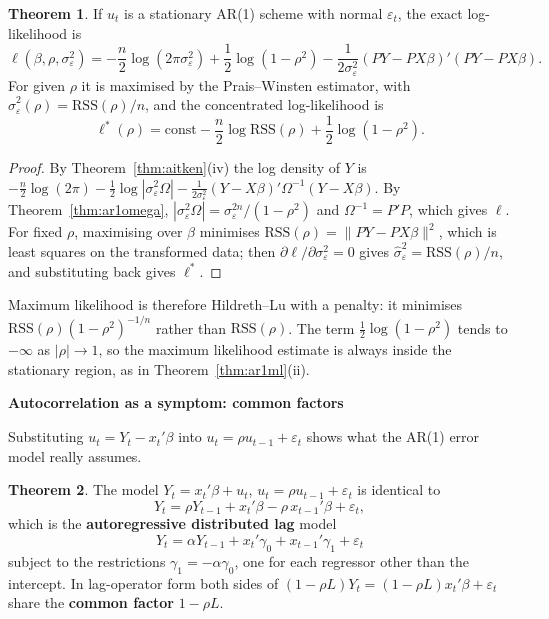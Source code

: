 \documentclass[11pt,a4paper]{article}
\numberwithin{equation}{section}
\theoremstyle{definition}
\newtheorem{thm}{Theorem}[subsection]
\newcommand{\subhead}[1]{%
  \par\medskip\noindent\textbf{#1}\par\nobreak\smallskip}
\begin{document}
\begin{thm}
\label{thm:acml}
If $u_t$ is a stationary AR(1) scheme with normal $\varepsilon_t$, the exact log-likelihood is
\[
\ell(\beta, \rho, \sigma_\varepsilon^2) = -\frac n2\log(2\pi\sigma_\varepsilon^2) + \frac12\log(1 - \rho^2) - \frac{1}{2\sigma_\varepsilon^2}(PY - PX\beta)'(PY - PX\beta) .
\]
For given $\rho$ it is maximised by the Prais--Winsten estimator, with $\hat\sigma_\varepsilon^2(\rho) = \text{RSS}(\rho)/n$, and the concentrated log-likelihood is
\[
\ell^*(\rho) = \text{const} - \frac n2\log\text{RSS}(\rho) + \frac12\log(1 - \rho^2) .
\]
\end{thm}

\begin{proof}
By Theorem~\ref{thm:aitken}(iv) the log density of $Y$ is $-\frac n2\log(2\pi) - \frac12\log|\sigma_\varepsilon^2\Omega| - \frac{1}{2\sigma_\varepsilon^2}(Y - X\beta)'\Omega^{-1}(Y - X\beta)$. By
Theorem~\ref{thm:ar1omega}, $|\sigma_\varepsilon^2\Omega| = \sigma_\varepsilon^{2n}/(1 - \rho^2)$ and $\Omega^{-1} = P'P$, which gives $\ell$. For fixed $\rho$, maximising over $\beta$ minimises
$\text{RSS}(\rho) = \|PY - PX\beta\|^2$, which is least squares on the transformed data; then $\partial\ell/\partial\sigma_\varepsilon^2 = 0$ gives $\hat\sigma_\varepsilon^2 = \text{RSS}(\rho)/n$, and
substituting back gives $\ell^*$.
\end{proof}

Maximum likelihood is therefore Hildreth--Lu with a penalty: it minimises $\text{RSS}(\rho)(1 - \rho^2)^{-1/n}$ rather than $\text{RSS}(\rho)$. The term $\frac12\log(1 - \rho^2)$
tends to $-\infty$ as $|\rho| \to 1$, so the maximum likelihood estimate is always inside the stationary region, as in Theorem~\ref{thm:ar1ml}(ii).

\subhead{Autocorrelation as a symptom: common factors}
Substituting $u_t = Y_t - x_t'\beta$ into $u_t = \rho u_{t-1} + \varepsilon_t$ shows what the AR(1) error model really assumes.

\begin{thm}
\label{thm:comfac}
The model $Y_t = x_t'\beta + u_t$, $u_t = \rho u_{t-1} + \varepsilon_t$ is identical to
\[
Y_t = \rho Y_{t-1} + x_t'\beta - \rho\,x_{t-1}'\beta + \varepsilon_t ,
\]
which is the \textbf{autoregressive distributed lag} model
\[
Y_t = \alpha Y_{t-1} + x_t'\gamma_0 + x_{t-1}'\gamma_1 + \varepsilon_t
\]
subject to the restrictions $\gamma_1 = -\alpha\gamma_0$, one for each regressor other than the intercept. In lag-operator form both sides of
$(1 - \rho L)Y_t = (1 - \rho L)x_t'\beta + \varepsilon_t$ share the \textbf{common factor} $1 - \rho L$.
\end{thm}
\end{document}
